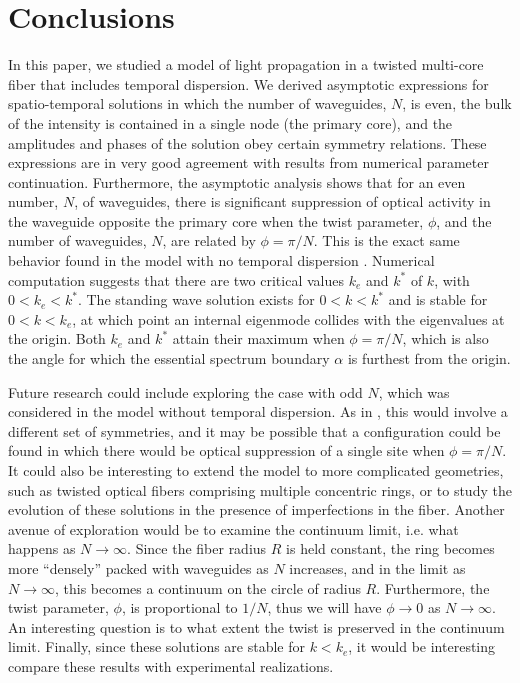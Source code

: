 \documentclass[11pt,reqno]{amsart}
\begin{document}
\section{Conclusions}

In this paper, we studied a model of light propagation in a twisted multi-core fiber that includes temporal dispersion. We derived asymptotic expressions for spatio-temporal solutions in which the number of waveguides, $N$, is even, the bulk of the intensity is contained in a single node (the primary core), and the amplitudes and phases of the solution obey certain symmetry relations. These expressions are in very good agreement with results from numerical parameter continuation. Furthermore, the asymptotic analysis shows that for an even number, $N$, of waveguides, there is significant suppression of optical activity in the waveguide opposite the primary core when the twist parameter, $\phi$, and the number of waveguides, $N$, are related by $\phi = \pi/N$. This is the exact same behavior found in the model with no temporal dispersion \cite{parker2021}.
Numerical computation suggests that there are two critical values $k_e$ and $k^*$ of $k$, with $0 < k_e < k^*$. The standing wave solution exists for $0 < k < k^*$ and is stable for $0 < k < k_e$, at which point an internal eigenmode collides with the eigenvalues at the origin. Both $k_e$ and $k^*$ attain their maximum when $\phi = \pi/N$, which is also the angle for which the essential spectrum boundary $\alpha$ is furthest from the origin.

Future research could include exploring the case with odd $N$, which was considered in the model without temporal dispersion. As in \cite{parker2021}, this would involve a different set of symmetries, and it may be possible that a configuration could be found in which there would be optical suppression of a single site when $\phi = \pi/N$. It could also be interesting to extend the model to more complicated geometries, such as twisted optical fibers comprising multiple concentric rings, or to study the evolution of these solutions in the presence of imperfections in the fiber. Another avenue of exploration would be to examine the continuum limit, i.e. what happens as $N \rightarrow \infty$. Since the fiber radius $R$ is held constant, the ring becomes more ``densely'' packed with waveguides as $N$ increases, and in the limit as $N \rightarrow \infty$, this becomes a continuum on the circle of radius $R$. Furthermore, the twist parameter, $\phi$, is proportional to $1/N$, thus we will have $\phi \rightarrow 0$ as $N \rightarrow \infty$. An interesting question is to what extent the twist is preserved in the continuum limit. Finally, since these solutions are stable for $k < k_e$, it would be interesting compare these results with experimental realizations.
\end{document}
